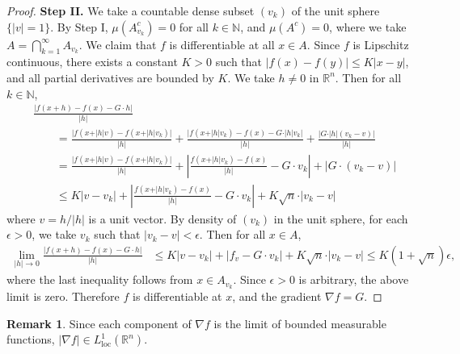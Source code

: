 \documentclass{article}
\numberwithin{equation}{section}
\newcommand{\bbN}{\mathbb{N}}
\newcommand{\bbR}{\mathbb{R}}
\newcommand{\loc}{\mathrm{loc}}
\theoremstyle{plain}
\theoremstyle{definition}
\newtheorem*{remark}{Remark}
\begin{document}
\begin{proof}
\item\textbf{Step II.} We take a countable dense subset $(v_k)$ of the unit sphere $\{\vert v\vert=1\}$. By Step I, $\mu(A_{v_k}^c)=0$ for all $k\in\bbN$, and $\mu(A^c)=0$, where we take $A=\bigcap_{k=1}^\infty A_{v_k}$. We claim that $f$ is differentiable at all $x\in A$. Since $f$ is Lipschitz continuous, there exists a constant $K>0$ such that $\vert f(x)-f(y)\vert\leq K\vert x-y\vert$, and all partial derivatives are bounded by $K$. We take $h\neq 0$ in $\bbR^n$. Then for all $k\in\bbN$,
\begin{align*}
	&\frac{\vert f(x+h)-f(x)-G\cdot h\vert}{\vert h\vert}\\
	&\qquad=\frac{\vert f(x+\vert h\vert v)-f(x+\vert h\vert v_k)\vert}{\vert h\vert}+\frac{\vert f(x+\vert h\vert v_k)-f(x)-G\cdot \vert h\vert v_k\vert}{\vert h\vert}+\frac{\vert G\cdot\vert h\vert(v_k-v)\vert}{\vert h\vert}\\
	&\qquad=\frac{\vert f(x+\vert h\vert v)-f(x+\vert h\vert v_k)\vert}{\vert h\vert}+\left\vert\frac{f(x+\vert h\vert v_k)-f(x)}{\vert h\vert}-G\cdot v_k\right\vert+\left\vert G\cdot (v_k-v)\right\vert\\
	&\qquad\leq K\vert v-v_k\vert+\left\vert\frac{f(x+\vert h\vert v_k)-f(x)}{\vert h\vert}-G\cdot v_k\right\vert+ K\sqrt{n}\cdot\vert v_k-v\vert
\end{align*}
where $v=h/\vert h\vert$ is a unit vector. By density of $(v_k)$ in the unit sphere, for each $\epsilon>0$, we take $v_k$ such that $\vert v_k-v\vert<\epsilon$. Then for all $x\in A$, 
\begin{align*}
	\lim_{\vert h\vert\to 0}\frac{\vert f(x+h)-f(x)-G\cdot h\vert}{\vert h\vert}&\leq K\vert v-v_k\vert+\left\vert f_v-G\cdot v_k\right\vert+K\sqrt{n}\cdot\vert v_k-v\vert\leq K(1+\sqrt{n})\epsilon,
\end{align*}
where the last inequality follows from $x\in A_{v_k}$. Since $\epsilon>0$ is arbitrary, the above limit is zero. Therefore $f$ is differentiable at $x$, and the gradient $\nabla f=G$. 
\end{proof}
\begin{remark}
Since each component of $\nabla f$ is the limit of bounded measurable functions, $\vert\nabla f\vert\in L^1_\loc(\bbR^n)$.
\end{remark}
\newpage
\end{document}
